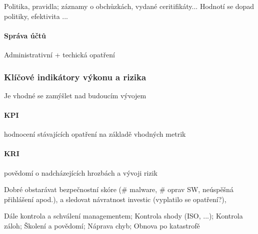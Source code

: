 \documentclass[10pt,a4paper]{article}
\begin{document}
Politika, pravidla; záznamy o obchůzkách, vydané ceritifikáty... Hodnotí se dopad politiky, efektivita ...

\paragraph*{Správa účtů}
Administrativní + techická opatření

\subsubsection*{Klíčové indikátory výkonu a rizika}
Je vhodné se zamýšlet nad budoucím vývojem 

\paragraph*{KPI} hodnocení stávajících opatření na základě vhodných metrik
\paragraph*{KRI} povědomí o nadcházejících hrozbách a vývoji rizik

Dobré obstarávat bezpečnostní skóre ($\#$ malware, $\#$ oprav SW, neúspěšná přihlášení apod.), a sledovat návratnost investic (vyplatilo se opatření?), 


Dále kontrola a schválení managementem; Kontrola shody (ISO, ...); Kontrola záloh; Školení a povědomí; Náprava chyb; Obnova po katastrofě
\end{document}

